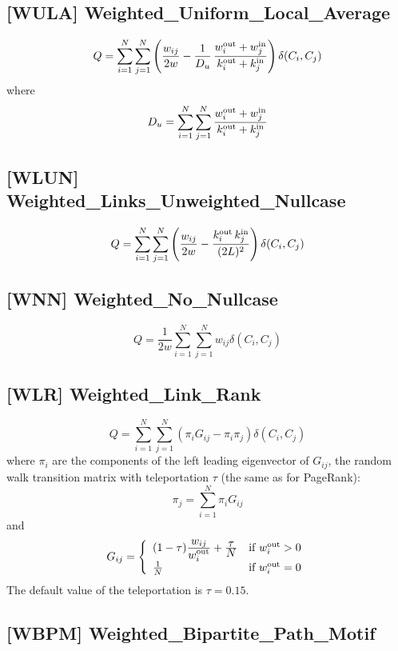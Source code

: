 \documentclass[11pt]{article}
\newcommand{\beq}{\begin{equation}}
\newcommand{\eeq}{\end{equation}}
\newcommand{\ba}[1]{\begin{array}{#1}}
\newcommand{\ea}{\end{array}}
\newcommand{\ds}{\displaystyle}
\newcommand{\sz}{\scriptsize}
\newcommand{\wout}[2]{{#1}_{#2}^{\mbox{\sz out}}}
\newcommand{\win}[2]{{#1}_{#2}^{\mbox{\sz in}}}
\begin{document}
\subsection{[WULA] Weighted\_Uniform\_Local\_Average}

\beq
  Q = \sum_{i=1}^N \sum_{j=1}^N \left(
       \frac{w_{ij}}{2w}
       - \frac{1}{D_u}\,\frac{\wout{w}{i}+\win{w}{j}}{\wout{k}{i}+\win{k}{j}}
      \right)\delta(C_i,C_j)
\eeq
where
\beq
  D_u = \sum_{i=1}^N \sum_{j=1}^N \frac{\wout{w}{i}+\win{w}{j}}{\wout{k}{i}+\win{k}{j}}
\eeq


\subsection{[WLUN] Weighted\_Links\_Unweighted\_Nullcase}

\beq
  Q = \sum_{i=1}^N \sum_{j=1}^N \left(
       \frac{w_{ij}}{2w} - \frac{\wout{k}{i}\,\win{k}{j}}{(2L)^2}
      \right)\delta(C_i,C_j)
\eeq


\subsection{[WNN] Weighted\_No\_Nullcase}

\beq
  Q = \frac{1}{2w} \sum_{i=1}^N \sum_{j=1}^N
        w_{ij}
      \delta(C_i,C_j)
\eeq


\subsection{[WLR] Weighted\_Link\_Rank}

\beq
  Q = \sum_{i=1}^N \sum_{j=1}^N \left(
        \pi_i G_{ij} - \pi_i \pi_j
      \right)\delta(C_i,C_j)
\eeq
where $\pi_i$ are the components of the left leading eigenvector of $G_{ij}$, the random walk transition matrix with teleportation $\tau$ (the same as for PageRank):
\beq
  \pi_j = \sum_{i=1}^N \pi_i G_{ij}
\eeq
and
\beq
  G_{ij} = \left\{
             \ba{ll}
               (1-\tau) \frac{\ds w_{ij}}{\ds\wout{w}{i}} + \frac{\ds\tau}{\ds N} & \mbox{if $\wout{w}{i} > 0$}
               \\
               \frac{1}{N} & \mbox{if $\wout{w}{i} = 0$}
             \ea
           \right.
\eeq
The default value of the teleportation is $\tau = 0.15$.


\subsection{[WBPM] Weighted\_Bipartite\_Path\_Motif}
\end{document}
